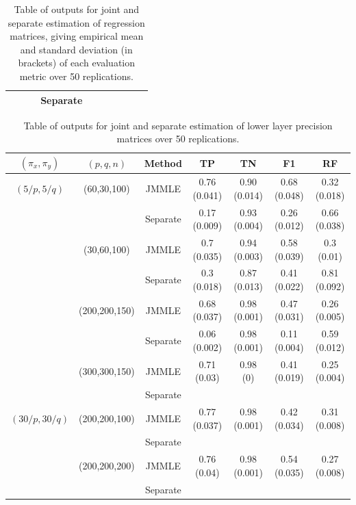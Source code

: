 \begin{scriptsize}
\begin{table}
\begin{tabular}{ccccccc}
    ~              & ~             & Separate & ~             & ~              & ~   & ~             \\ \hline
    \end{tabular}
    \caption{Table of outputs for joint and separate estimation of regression matrices, giving empirical mean and standard deviation (in brackets) of each evaluation metric over 50 replications.}
    \label{table:simtable11}
\end{table}
%
\begin{table}
    \begin{tabular}{ccccccc}
    \hline
    $(\pi_x, \pi_y)$ & $(p,q,n)$   & Method   & TP            & TN             & F1 & RF            \\ \hline
    $(5/p, 5/q)$   & (60,30,100)   & JMMLE    & 0.76 (0.041) & 0.90 (0.014)   & 0.68 (0.048)   & 0.32 (0.018) \\
    ~              & ~             & Separate & 0.17 (0.009) & 0.93 (0.004)  & 0.26 (0.012)    & 0.66 (0.038) \\
    ~              & (30,60,100)   & JMMLE    & 0.7 (0.035)  & 0.94 (0.003)  & 0.58 (0.039)   & 0.3 (0.01) \\
    ~              & ~             & Separate & 0.3 (0.018)  & 0.87 (0.013)  & 0.41 (0.022)   & 0.81 (0.092) \\
    ~              & (200,200,150) & JMMLE    & 0.68 (0.037) & 0.98 (0.001)  & 0.47 (0.031)   & 0.26 (0.005) \\
    ~              & ~             & Separate & 0.06 (0.002) & 0.98 (0.001)  & 0.11 (0.004)   & 0.59 (0.012) \\
    ~              & (300,300,150) & JMMLE    & 0.71 (0.03)  & 0.98 (0)      & 0.41 (0.019)   & 0.25 (0.004) \\
    ~              & ~             & Separate & ~             & ~              & ~   & ~             \\\hline
    $(30/p, 30/q)$ & (200,200,100) & JMMLE    & 0.77 (0.037) & 0.98 (0.001)  & 0.42 (0.034)   & 0.31 (0.008) \\
    ~              & ~             & Separate & ~             & ~              & ~   & ~             \\
    ~              & (200,200,200) & JMMLE    & 0.76 (0.04)  & 0.98 (0.001)  & 0.54 (0.035)   & 0.27 (0.008) \\
    ~              & ~             & Separate & ~             & ~              & ~   & ~             \\ \hline
    \end{tabular}
    \caption{Table of outputs for joint and separate estimation of lower layer precision matrices over 50 replications.}
    \label{table:simtable12}
\end{table}
\end{scriptsize}

